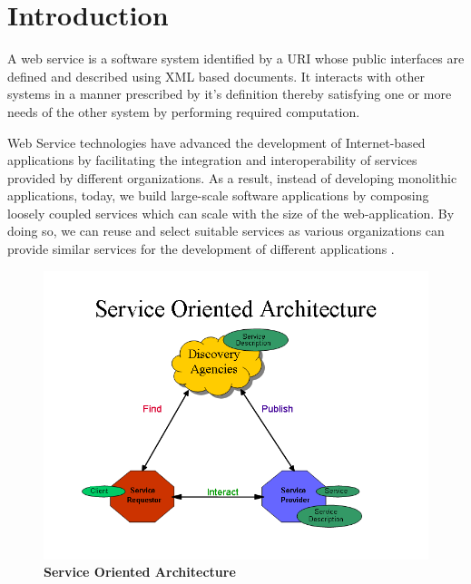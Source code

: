 \documentclass[12pt, oneside]{book}
\begin{document}
\chapter{Introduction}
A web service is a software system identified by a URI whose public interfaces are defined and described using XML based documents. It interacts with other systems in a manner prescribed by it's definition thereby satisfying one or more needs of the other system by performing required computation. \\ \par
Web Service technologies have advanced the development of Internet-based applications by facilitating the integration and interoperability of services provided by different organizations. As a result, instead of developing monolithic applications, today, we build large-scale software applications by composing loosely coupled services which can scale with the size of the web-application. By doing so, we can reuse and select suitable services as various organizations can provide similar services for the development of different applications \cite{context_aware}.
\begin{figure}[H]
  \centering
  \includegraphics[width=\textwidth]{pics/soa.png}
  \caption{\textbf{Service Oriented Architecture \cite{web_arch_website}}}
\end{figure}
\end{document}
